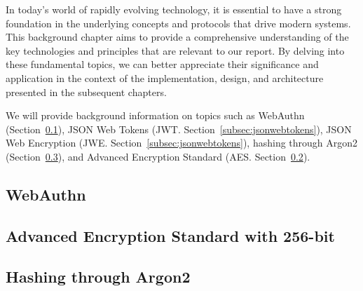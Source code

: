 
In today's world of rapidly evolving technology, it is essential to have a
strong foundation in the underlying concepts and protocols that drive modern
systems.
This background chapter aims to provide a comprehensive understanding of the key
technologies and principles that are relevant to our report.
By delving into these fundamental topics, we can better appreciate their
significance and application in the context of the implementation, design, and
architecture presented in the subsequent chapters.


We will provide background information on topics such as WebAuthn
(Section~\ref{subsec:webauthn}), JSON Web Tokens (JWT\@.
Section~\ref{subsec:jsonwebtokens}), JSON Web Encryption (JWE\@.
Section~\ref{subsec:jsonwebtokens}), hashing through Argon2
(Section~\ref{subsec:hashing-through-argon2}), and Advanced Encryption Standard
(AES. Section~\ref{subsec:aes}).


\subsection{WebAuthn}\label{subsec:webauthn}


\subsection{Advanced Encryption Standard with 256-bit}\label{subsec:aes}


\subsection{Hashing through Argon2}\label{subsec:hashing-through-argon2}


